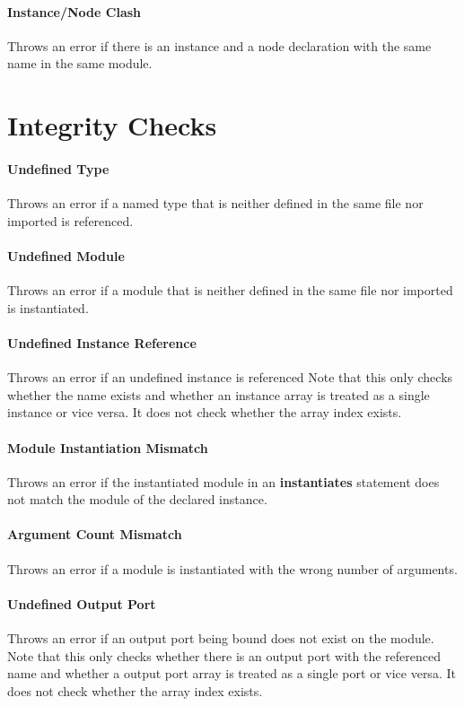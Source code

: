 \documentclass[a4paper,11pt,twoside]{report}
\begin{document}
{{{\paragraph{Instance/Node Clash}
Throws an error if there is an instance and a node declaration with the same name in the same module.

\section{Integrity Checks}
\paragraph{Undefined Type}
Throws an error if a named type that is neither defined in the same file nor imported is referenced.

\paragraph{Undefined Module}
Throws an error if a module that is neither defined in the same file nor imported is instantiated.

\paragraph{Undefined Instance Reference}
Throws an error if an undefined instance is referenced
Note that this only checks whether the name exists and whether an instance array is treated as a single instance or vice versa.
It does not check whether the array index exists.

\paragraph{Module Instantiation Mismatch}
Throws an error if the instantiated module in an \textbf{instantiates} statement does not match the module of the declared instance.

\paragraph{Argument Count Mismatch}
Throws an error if a module is instantiated with the wrong number of arguments.

\paragraph{Undefined Output Port}
Throws an error if an output port being bound does not exist on the module.
Note that this only checks whether there is an output port with the referenced name and whether a output port array is treated as a single port or vice versa.
It does not check whether the array index exists.

}}}
\end{document}
